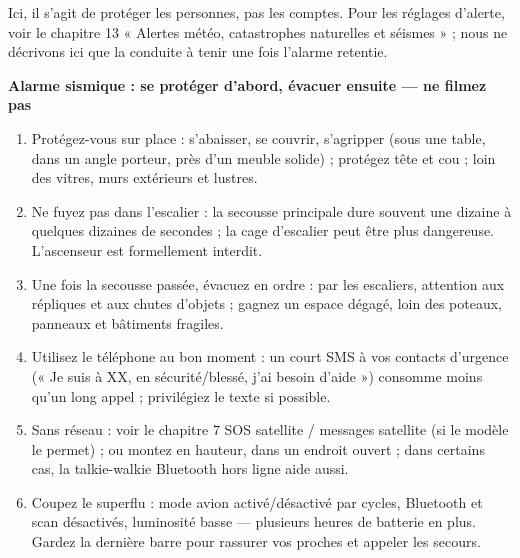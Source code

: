 


Ici, il s'agit de protéger les personnes, pas les comptes. Pour les réglages d'alerte, voir le chapitre 13 « Alertes météo, catastrophes naturelles et séismes » ; nous ne décrivons ici que la conduite à tenir une fois l'alarme retentie.

\textbf{Alarme sismique : se protéger d'abord, évacuer ensuite — ne filmez pas}\par

\begin{enumerate}
  \item Protégez-vous sur place : s'abaisser, se couvrir, s'agripper (sous une table, dans un angle porteur, près d'un meuble solide) ; protégez tête et cou ; loin des vitres, murs extérieurs et lustres.
  \item Ne fuyez pas dans l'escalier : la secousse principale dure souvent une dizaine à quelques dizaines de secondes ; la cage d'escalier peut être plus dangereuse. L'ascenseur est formellement interdit.
  \item Une fois la secousse passée, évacuez en ordre : par les escaliers, attention aux répliques et aux chutes d'objets ; gagnez un espace dégagé, loin des poteaux, panneaux et bâtiments fragiles.
  \item Utilisez le téléphone au bon moment : un court SMS à vos contacts d'urgence (« Je suis à XX, en sécurité/blessé, j'ai besoin d'aide ») consomme moins qu'un long appel ; privilégiez le texte si possible.
  \item Sans réseau : voir le chapitre 7 SOS satellite / messages satellite (si le modèle le permet) ; ou montez en hauteur, dans un endroit ouvert ; dans certains cas, la talkie-walkie Bluetooth hors ligne aide aussi.
  \item Coupez le superflu : mode avion activé/désactivé par cycles, Bluetooth et scan désactivés, luminosité basse — plusieurs heures de batterie en plus. Gardez la dernière barre pour rassurer vos proches et appeler les secours.
\end{enumerate}

